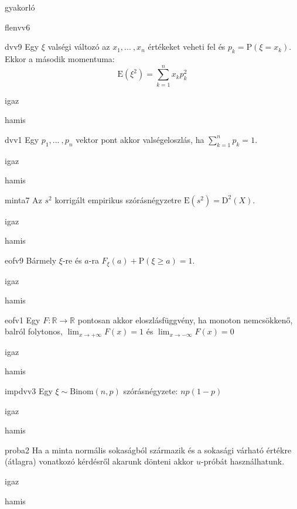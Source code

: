 \documentclass[12pt]{article}
\begin{document}
\begin{quiz}{gyakorló}
\begin{multi}[feedback={Tulajdonság.}]{flenvv6}
\end{multi}
\begin{multi}[feedback={Def.}]{dvv9}
Egy $\xi$ valségi változó az $x_1,{...\:}, x_n$ értékeket veheti fel és $p_k=\mathrm{P}(\xi=x_k)$. 
Ekkor a második momentuma:
$$
\mathrm{E}(\xi^2)=\sum_{k=1}^n x_k p_k^2
$$
\item igaz
\item* hamis
\end{multi}
\begin{multi}[feedback={Fontos a $p_k\ge 0$ is.}]{dvv1}
Egy $p_1,{...\:}, p_n$ vektor pont akkor valségeloszlás, ha $\sum_{k=1}^n p_k=1$.
\item igaz
\item* hamis
\end{multi}
\begin{multi}[feedback={Az $s^2$ torzítatlan becslése a sokasági (elméleti) szórásnégyzetnek}]{minta7}
Az $s^2$ korrigált empirikus szórásnégyzetre $\mathrm{E}(s^2)=\mathrm{D}^2(X)$.
\item* igaz
\item hamis
\end{multi}
\begin{multi}[feedback={Komplementer események.}]{eofv9}
Bármely $\xi$-re és $a$-ra $F_{\xi}(a)+\mathrm{P}(\xi\ge a)=1$.
\item* igaz
\item hamis
\end{multi}
\begin{multi}[feedback={Def.}]{eofv1}
Egy $F:\mathbb{R}\to \mathbb{R}$ pontosan akkor eloszlásfüggvény, ha monoton nemcsökkenő, 
balról folytonos, $\lim_{x\to+\infty}F(x)=1$ és $\lim_{x\to-\infty}F(x)=0$
\item* igaz
\item hamis
\end{multi}
\begin{multi}[feedback={$\xi=\xi_1+{...\:}+\xi_n$, ahol $\xi_k$ Bernoulli és $\mathrm{E}(\xi_k)=p$+$\mathrm{E}$-additívitása}]{impdvv3}
Egy $\xi\sim \mathrm{Binom}(n,p)$ szórásnégyzete: $np(1-p)$
\item* igaz
\item hamis
\end{multi}
\begin{multi}[feedback={A szórást ismerni kell.}]{proba2}
Ha a minta normális sokaságból származik és a sokasági várható értékre (átlagra) vonatkozó kérdésről 
akarunk dönteni akkor $u$-próbát használhatunk.
\item igaz
\item* hamis

\end{multi}
\end{quiz}
\end{document}
